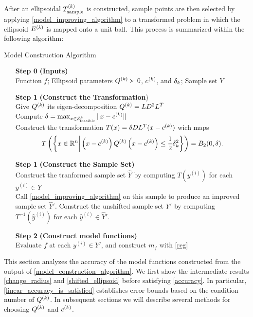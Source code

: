 After an ellipsoidal ${T_{\text{sample}}^{(k)}}$ is constructed,  sample points are then selected by applying  \cref{model_improving_algorithm} 
to a transformed problem in which the ellipsoid ${E^{(k)}}$ is mapped onto a unit ball.
This process is summarized within the following algorithm:

\begin{algorithm}[H]
    \caption{Model Construction Algorithm}
    \label{model_construction_algorithm}
    \begin{itemize}
        \item[\textbf{Step 0}] \textbf{(Inputs)} \\
			Function $f$;
			Ellipsoid parameters ${Q^{(k)}} \succ 0$, $c^{(k)}$, and $\delta_k$;
        	Sample set $Y$
        \item[\textbf{Step 1}] \textbf{(Construct the Transformation}) \\
        	Give ${Q^{(k)}}$ its eigen-decomposition ${Q^{(k)}} = LD^2L^T$  \\
        	Compute $\delta = \max_{x \in {\mathcal E^k_{\textrm{feasible}}}} \|x - c^{(k)}\|$\\
			Construct the transformation $T(x) = \delta D L^T(x - c^{(k)})$ wich maps 
\begin{align*}
	T\left(\left\{x \in \mathbb R^n \bigg | \left(x - c^{(k)}\right) {Q^{(k)}} \left(x -c^{(k)}\right) \le \frac 1 2 \delta_k^2\right\}\right) = B_2(0, \delta).
\end{align*}
        \item[\textbf{Step 1}] \textbf{(Construct the Sample Set)} \\
        Construct the tranformed sample set $\hat Y$ by computing $T\left(y^{(i)}\right)$ for each $y^{(i)} \in Y$ \\
        Call \cref{model_improving_algorithm} on this sample to produce an improved sample set $\hat Y '$.
        Construct the unshifted sample set $Y'$ by computing $T^{-1}\left(\hat y^{(i)}\right)$ for each $\hat y^{(i)} \in \hat Y'$.
        \item[\textbf{Step 2}] \textbf{(Construct model functions)} \\
        Evaluate $f$ at each $y^{(i)} \in Y'$, and construct $m_f$ with \cref{reg}
    \end{itemize}
\end{algorithm}

This section analyzes the accuracy of the model functions constructed from the output of \cref{model_construction_algorithm}.
We first show the intermediate results \cref{change_radius} and \cref{shifted_ellipsoid} 
before satisfying \cref{accuracy}.
In particular, \cref{linear_accuracy_is_satisfied} establishes error bounds based on the condition number of ${Q^{(k)}}$.
In subsequent sections we will describe several methods for choosing ${Q^{(k)}}$ and $c^{(k)}$.

